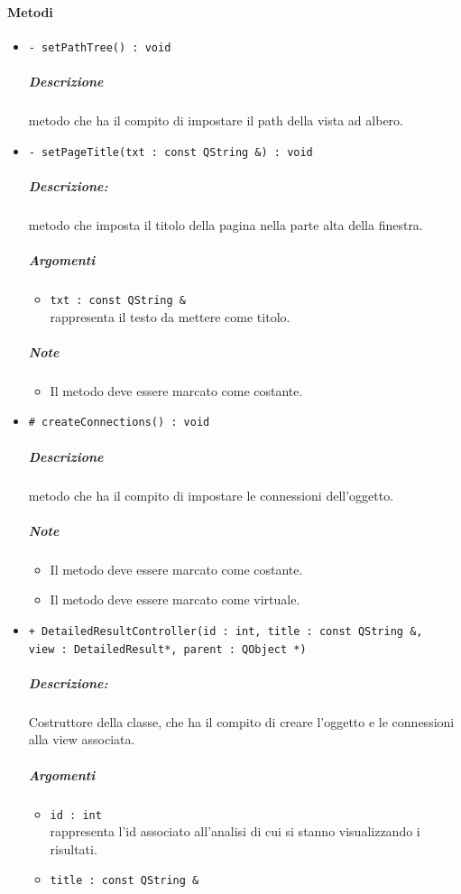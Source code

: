 	\paragraph{\color{black}Metodi}
		\begin{itemize}
			\item \color{blue} \verb!- setPathTree() : void!
			\color{black}
			\subparagraph{Descrizione} metodo che ha il compito di impostare  il path della vista ad albero.
			\item \color{blue} \verb!- setPageTitle(txt : const QString &) : void!
			\color{black}
			\subparagraph{Descrizione:} metodo che imposta il titolo della pagina nella parte alta della finestra.
			\color{black}
			\subparagraph{Argomenti}
			\begin{itemize}
				\item \color{RoyalPurple} \verb!txt : const QString &!\\				
\color{black} rappresenta il testo da mettere come titolo.
			\end{itemize}
			\subparagraph{Note}
			\begin{itemize}
				\item Il metodo deve essere marcato come costante.
			\end{itemize}
			\item \color{blue} \verb!# createConnections() : void!
			\color{black}
			\subparagraph{Descrizione} metodo che ha il compito di impostare le connessioni dell'oggetto.
			\subparagraph{Note}
			\begin{itemize}
				\item Il metodo deve essere marcato come costante.
				\item Il metodo deve essere marcato come virtuale.
			\end{itemize}
			\item \color{blue} \verb!+ DetailedResultController(id : int, title : const QString &, !\\ \verb!view : DetailedResult*, parent : QObject *)!
			\color{black}
			\subparagraph{Descrizione:} Costruttore della classe, che ha il compito di creare l'oggetto e le connessioni alla view associata.
			\color{black}
			\subparagraph{Argomenti}
			\begin{itemize}
				\item \color{RoyalPurple} \verb!id : int!\\				
\color{black} rappresenta l'id associato all'analisi di cui si stanno visualizzando i risultati.
				\item \color{RoyalPurple} \verb!title : const QString &!\\				

\end{itemize}
\end{itemize}
